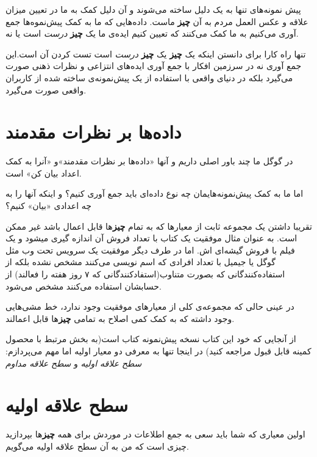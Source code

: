 پیش نمونه‌های تنها به یک دلیل ساخته می‌شوند و آن دلیل کمک به ما در تعیین
میزان علاقه و عکس العمل مردم به آن \textbf{چیز} ماست. داده‌هایی که ما به
کمک پیش‌نموه‌ها جمع آوری می‌کنیم به ما کمک می‌کنند که تعیین کنیم ایده‌ی
ما یک \textbf{چیز} \emph{درست} است یا نه.

تنها راه کارا برای دانستن اینکه یک \textbf{چیز} یک \textbf{چیز}
\emph{درست} است تست کردن آن است.این جمع آوری نه در سرزمین افکار با جمع
آوری ایده‌های انتزاعی و نظرات ذهنی صورت می‌گیرد بلکه در دنیای واقعی با
استفاده از یک پیش‌نمونه‌ی ساخته شده از کاربران واقعی صورت می‌گیرد.

\section{داده‌ها بر نظرات
مقدمند}\label{ux62fux627ux62fux647ux647ux627-ux628ux631-ux646ux638ux631ux627ux62a-ux645ux642ux62fux645ux646ux62f}

در گوگل ما چند باور اصلی داریم و آنها «داده‌ها بر نظرات مقدمند»و «آنرا
به کمک اعداد بیان کن» است.

اما ما به کمک پیش‌نمونه‌هایمان چه نوع داده‌ای باید جمع آوری کنیم؟ و
اینکه آنها را به چه اعدادی «بیان» کنیم؟

تقریبا داشتن یک مجموعه ثابت از معیارها که به تمام \textbf{چیز}ها قابل
اعمال باشد غیر ممکن است. به عنوان مثال موفقیت یک کتاب با تعداد فروش آن
اندازه گیری میشود و یک فیلم با فروش گیشه‌ای اش. اما در طرف دیگر موفقیت
یک سرویس تحت وب مثل گوگل یا جیمیل با تعداد افرادی که اسم نویسی می‌کنند
مشخص نشده بلکه از استفاده‌کنندگانی که بصورت متناوب(استفادکنندگانی که ۷
روز هفته را فعالند) از حسابشان استفاده می‌کنند مشخص می‌شود.

در عینی حالی که مجموعه‌ی کلی از معیارهای موفقیت وجود ندارد، خط مشی‌هایی
وجود داشته که به کمک کمی اصلاح به تمامی \textbf{چیز}ها قابل اعمالند.

از آنجایی که خود این کتاب نسخه پیش‌نمونه کتاب است(به بخش مرتبط با محصول
کمینه قابل قبول مراجعه کنید) در اینجا تنها به معرفی دو معیار اولیه اما
مهم می‌پردازم: \emph{سطح علاقه اولیه} و \emph{سطح علاقه مداوم}

\section{سطح علاقه
اولیه}\label{ux633ux637ux62d-ux639ux644ux627ux642ux647-ux627ux648ux644ux6ccux647}

اولین معیاری که شما باید سعی به جمع اطلاعات در موردش برای همه
\textbf{چیز}ها بپردازید چیزی است که من به آن سطح علاقه اولیه می‌گویم.

